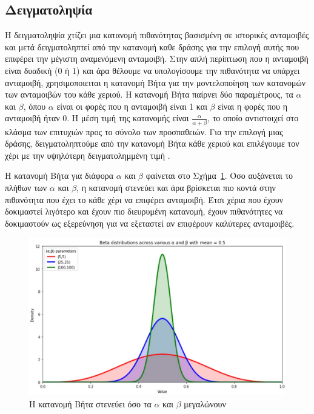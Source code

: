 \subsection{Δειγματοληψία }

Η δειγματοληψία  χτίζει μια κατανομή πιθανότητας βασισμένη σε ιστορικές ανταμοιβές και μετά δειγματοληπτεί από την κατανομή καθε δράσης για την επιλογή αυτής που επιφέρει την μέγιστη αναμενόμενη ανταμοιβή. Στην απλή περίπτωση που η ανταμοιβή είναι δυαδική (0 ή 1) και άρα θέλουμε να υπολογίσουμε την πιθανότητα να υπάρχει ανταμοιβή, χρησιμοποιειται η κατανομή Βήτα για την μοντελοποίηση των κατανομών των ανταμοιβών του κάθε χεριού. Η κατανομή Βήτα παίρνει δύο παραμέτρους, τα $α$ και $β$, όπου $α$ είναι οι φορές που η ανταμοιβή είναι 1 και $β$ είναι η φορές που η ανταμοιβή ήταν $0$. Η μέση τιμή της κατανομής είναι $\frac{α}{α+β}$, το οποίο αντιστοιχεί στο κλάσμα των επιτυχιών προς το σύνολο των προσπαθειών. Για την επιλογή μιας δράσης, δειγματοληπτούμε από την κατανομή Βήτα κάθε χεριού και επιλέγουμε τον χέρι με την υψηλότερη δειγματολημμένη τιμή \cite{thompsonsampling}.

H κατανομή Βήτα για διάφορα $α$ και $β$ φαίνεται στο Σχήμα~\ref{fig:beta_distribution}. Όσο αυξάνεται το πλήθων των $α$ και $β$, η κατανομή στενεύει και άρα βρίσκεται πιο κοντά στην πιθανότητα που έχει το κάθε χέρι να επιφέρει ανταμοιβή. Έτσι χέρια που έχουν δοκιμαστεί λιγότερο και έχουν πιο διευρυμένη κατανομή, έχουν πιθανότητες να δοκιμαστούν ως εξερεύνηση για να εξεταστεί αν επιφέρουν καλύτερες ανταμοιβές.

\begin{figure}
    \centering
    \includegraphics[width=\textwidth]{body_matter/bandits/images/beta-distribution.jpg}
    \caption{Η κατανομή Βήτα στενεύει όσο τα $α$ και $β$ μεγαλώνουν}
    \label{fig:beta_distribution}
\end{figure}

